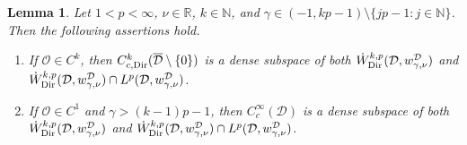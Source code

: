 \documentclass[12pt,a4paper, reqno]{amsart}
\theoremstyle{plain}
\newtheorem{lemma}[theorem]{Lemma}
\theoremstyle{definition}
\theoremstyle{remark}
\numberwithin{equation}{section}
\newcommand{\1}{\mathbbm{1}}
\newcommand{\R}{\ensuremath{\mathbb{R}}}
\newcommand{\N}{\ensuremath{\mathbb{N}}}
\newcommand{\calO}{\ensuremath{\mathcal{O}}}
\newcommand{\calD}{\ensuremath{\mathcal{D}}}
\newcommand{\Dir}{\textup{Dir}}
\begin{document}
\begin{lemma}\label{lem:smooth:dense}
Let $1<p<\infty$, $\nu\in\R$, $k\in\N$, and $\gamma\in(-1,kp-1)\setminus\{jp-1\colon j\in\N\}$. Then the following assertions hold.
\begin{enumerate}[label=\textup{(\roman*)}]
    \item\label{it:smooth:dense:Dir} If $\calO \in C^k$, then $C_{c,\Dir}^k(\overline{\calD}\setminus\{0\})$ is a dense subspace of both $\Dot{W}^{k,p}_\Dir(\calD,w_{\gamma,\nu}^\calD)$ and $\Dot{W}^{k,p}_\Dir(\calD,w_{\gamma,\nu}^\calD)\cap L^p(\calD,w_{\gamma,\nu}^\calD)$.
    \item\label{it:smooth:dense:test} If $\calO \in C^1$ and $\gamma>(k-1)p-1$, then $C_c^\infty(\calD)$ is a dense subspace of both $\Dot{W}^{k,p}_\Dir(\calD,w_{\gamma,\nu}^\calD)$ and $\Dot{W}^{k,p}_\Dir(\calD,w_{\gamma,\nu}^\calD)\cap L^p(\calD,w_{\gamma,\nu}^\calD)$.
\end{enumerate}
\end{lemma}
\end{document}
